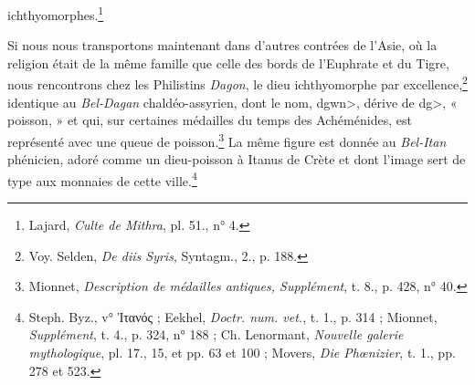 \documentclass[a4paper, 11pt, oneside]{article}
\begin{document}
ichthyomorphes.\footnote{Lajard, \emph{Culte de Mithra}, pl. 51., n° 4.}

Si nous nous transportons maintenant dans d'autres contrées de l'Asie, où la religion était de la même famille que celle des bords de l'Euphrate et du Tigre, nous rencontrons chez les Philistins \emph{Dagon}, le dieu ichthyomorphe par excellence,\footnote{Voy. Selden, \emph{De diis Syris}, Syntagm., 2., p. 188.} identique au \emph{Bel-Dagan} chaldéo-assyrien, dont le nom, \<dgwn>, dérive de \<dg>, « poisson, » et qui, sur certaines médailles du temps des Achéménides, est représenté avec une queue de poisson.\footnote{Mionnet, \emph{Description de médailles antiques, Supplément}, t. 8., p. 428, n° 40.} La même figure est donnée au \emph{Bel-Itan} phénicien, adoré comme un dieu-poisson à Itanus de Crète et dont l'image sert de type aux monnaies de cette ville.\footnote{Steph. Byz., v° Ἰτανός ; Eekhel, \emph{Doctr. num. vet.}, t. 1., p. 314 ; Mionnet, \emph{Supplément}, t. 4., p. 324, n° 188 ; Ch. Lenormant, \emph{Nouvelle galerie mythologique}, pl. 17., 15, et pp. 63 et 100 ; Movers, \emph{Die Phœnizier}, t. 1., pp. 278 et 523.}
\end{document}

